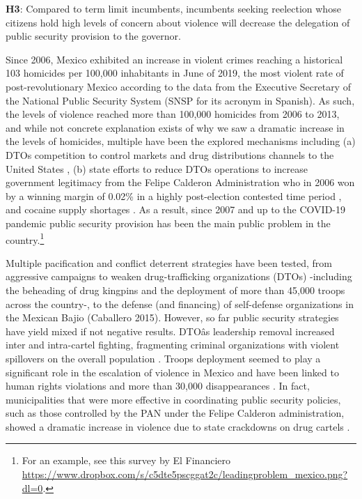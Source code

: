 \documentclass[12pt]{amsart}
\makeatletter
\def\section{\@startsection{section}{1}
	\z@{1.0\linespacing\@plus\linespacing}{.5\linespacing}{\Large}}
\numberwithin{equation}{section}
\theoremstyle{definition}
\theoremstyle{definition}
\theoremstyle{definition}
\makeatother
\begin{document}
\bigskip

\textbf{H3}: Compared to term limit incumbents, incumbents seeking reelection whose citizens hold high levels of concern about violence will decrease the delegation of public security provision to the governor.
   

\section{Mexico's War on Drugs}

Since 2006, Mexico exhibited an increase in violent crimes reaching a historical 103 homicides per 100,000 inhabitants in June of 2019, the most violent rate of post-revolutionary Mexico according to the data from the Executive Secretary of the National Public Security System (SNSP for its acronym in Spanish). As such, the levels of violence reached more than 100,000 homicides from 2006 to 2013, and while not concrete explanation exists of why we saw a dramatic increase in the levels of homicides, multiple have been the explored mechanisms including (a) DTOs competition to control markets and drug distributions channels to the United States \citep{rios_2013, dell_2015}, (b) state efforts to reduce DTOs operations \citep{rios_2013} to increase government legitimacy from the Felipe Calderon Administration who in 2006 won by a winning margin of 0.02\% in a highly post-election contested time period \citep{dell_2015}, and cocaine supply shortages \citep{castillo_etal_2018}. As a result, since 2007 and up to the COVID-19 pandemic public security provision has been the main public problem in the country.\footnote{For an example, see this survey by El Financiero \url{https://www.dropbox.com/s/c5dte5pscggat2c/leadingproblem_mexico.png?dl=0}.} 

Multiple pacification and conflict deterrent strategies have been tested, from aggressive campaigns to weaken drug-trafficking organizations (DTOs) -including the beheading of drug kingpins and the deployment of more than 45,000 troops across the country-, to the defense (and financing) of self-defense organizations in the Mexican Bajio (Caballero 2015). However, so far public security strategies have yield mixed if not negative results. DTOâs leadership removal increased inter and intra-cartel fighting, fragmenting criminal organizations with violent spillovers on the overall population \citep{guerrero_2011}. Troops deployment seemed to play a significant role in the escalation of violence in Mexico \citep{escalante_2011} and have been linked to human rights violations and more than 30,000 disappearances \citep{daly_etal_2012, moloeznik_etal_2012, magaloni_magaloni_razu_2018}. In fact, municipalities that were more effective in coordinating public security policies, such as those controlled by the PAN under the Felipe Calderon administration, showed a dramatic increase in violence due to state crackdowns on drug cartels \citep{dell_2015}. 
\end{document}

